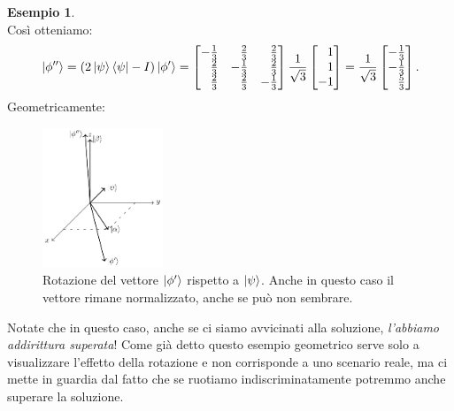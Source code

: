 \documentclass{book}
\theoremstyle{definition}
\theoremstyle{definition}
\theoremstyle{definition}
\newtheorem*{ex}{Esempio}
\theoremstyle{plain}
\theoremstyle{plain}
\theoremstyle{plain}
\theoremstyle{plain}
\begin{document}
\begin{ex}
\begin{displaymath}
\end{displaymath}
Così otteniamo:
\begin{displaymath}
\ket{\phi''} = (2\ket{\psi}\bra{\psi}-I) \ket{\phi'} = \begin{bmatrix*}[r]
-\frac{1}{3} & \frac{2}{3} & \frac{2}{3}\\
\frac{2}{3} & -\frac{1}{3} & \frac{2}{3}\\
\frac{2}{3} & \frac{2}{3} & -\frac{1}{3}
\end{bmatrix*}
\frac{1}{\sqrt{3}}
\begin{bmatrix*}[r]
1 \\
1 \\
-1 
\end{bmatrix*}
= 
\frac{1}{\sqrt{3}} \begin{bmatrix*}[r]
-\frac{1}{3} \\
-\frac{1}{3} \\
\frac{5}{3}
\end{bmatrix*}.
\end{displaymath}
Geometricamente:
\begin{figure}[H]
\begin{center}
\captionsetup{font=scriptsize}
    \includegraphics[width=0.32\textwidth]{Immagini troppo complicate/immagine1.pdf}
\caption{\scriptsize Rotazione del vettore $\ket{\phi'}$ rispetto a $\ket{\psi}$. Anche in questo caso il vettore rimane normalizzato, anche se può non sembrare.}\label{fig:3d_figure_3}
\end{center} %
\end{figure}
\noindent Notate che in questo caso, anche se ci siamo avvicinati alla soluzione, \emph{l'abbiamo addirittura superata}! Come già detto questo esempio geometrico serve solo a visualizzare l'effetto della rotazione e non corrisponde a uno scenario reale, ma ci mette in guardia dal fatto che se ruotiamo indiscriminatamente potremmo anche superare la soluzione. 
\end{ex}
\end{document}
